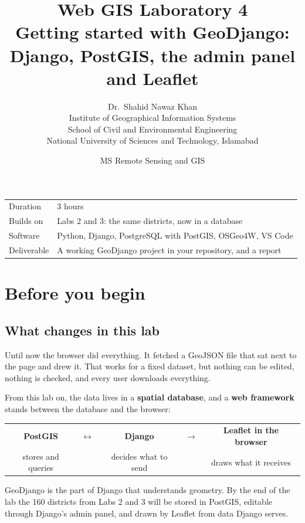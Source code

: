 \documentclass{article}
\title{Web GIS Laboratory 4\\[.3em]\large Getting started with GeoDjango:
       Django, PostGIS, the admin panel and Leaflet}
\author{Dr.\ Shahid Nawaz Khan\\
        Institute of Geographical Information Systems\\
        School of Civil and Environmental Engineering\\
        National University of Sciences and Technology, Islamabad}
\date{MS Remote Sensing and GIS}
\begin{document}
\maketitle

\begin{tabularx}{\textwidth}{@{}L{3.4cm} X@{}}
\toprule
Duration    & 3 hours \\
Builds on   & Labs 2 and 3: the same districts, now in a database \\
Software    & Python, Django, PostgreSQL with PostGIS, OSGeo4W, VS Code \\
Deliverable & A working GeoDjango project in your repository, and a report \\
\bottomrule
\end{tabularx}

\tableofcontents


\section*{Before you begin}

\subsection*{What changes in this lab}

Until now the browser did everything. It fetched a GeoJSON file that sat
next to the page and drew it. That works for a fixed dataset, but nothing
can be edited, nothing is checked, and every user downloads everything.

From this lab on, the data lives in a \textbf{spatial database}, and a
\textbf{web framework} stands between the database and the browser:

\vspace{.4em}
\begin{center}
\begin{tabular}{c c c c c}
\textbf{PostGIS} & $\longleftrightarrow$ & \textbf{Django} &
$\longrightarrow$ & \textbf{Leaflet in the browser} \\[.2em]
\small stores and queries & & \small decides what to send & &
\small draws what it receives \\
\end{tabular}
\end{center}
\vspace{.4em}

GeoDjango is the part of Django that understands geometry. By the end
of the lab the 160 districts from Labs 2 and 3 will be stored in PostGIS,
editable through Django's admin panel, and drawn by Leaflet from data
Django serves.
\end{document}
